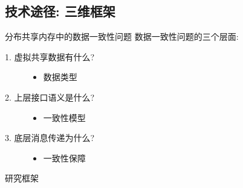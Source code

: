 \subsection{技术途径: 三维框架}

\begin{frame}{分布共享内存中的数据一致性问题}
      数据一致性问题的三个层面: 
      \begin{description}
	\item[1. 虚拟共享数据有什么?]
	  \begin{itemize}
	    \item 数据类型
	  \end{itemize}
	\item[2. 上层接口语义是什么?]
	  \begin{itemize}
	    \item 一致性模型
	  \end{itemize}
	\item[3. 底层消息传递为什么?]
	  \begin{itemize}
	    \item 一致性保障
	  \end{itemize}
      \end{description}
\end{frame}
\begin{frame}{研究框架}
\end{frame}
